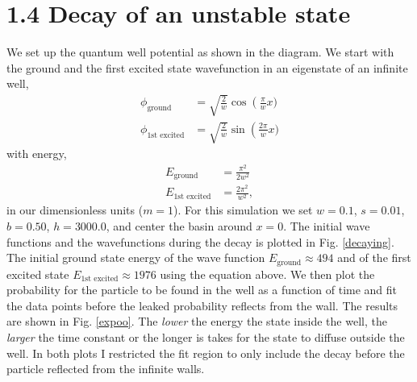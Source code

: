 \documentclass[singlepage,notitlepage,nofootinbib,11pt]{revtex4-1}
\begin{document}
\clearpage
\section*{1.4 Decay of an unstable state}
We set up the quantum well potential as shown in the diagram. We start with the ground and the first excited state wavefunction in an eigenstate of an infinite well,
\begin{align*}
  \phi_{\text{ground}} &= \sqrt{\frac{2}{w}}\cos\left(\frac{\pi}{w}x)\\
  \phi_{\text{1st excited}} &= \sqrt{\frac{2}{w}}\sin\left(\frac{2\pi}{w}x)
\end{align*}
with energy,
\begin{align*}
  E_{\text{ground}} &= \frac{\pi^2}{2 w^2}\\
  E_{\text{1st excited}} &= \frac{2 \pi^2}{w^2},
\end{align*}
in our dimensionless units ($m=1$). For this simulation we set $w=0.1$, $s=0.01$, $b=0.50$, $h=3000.0$, and center the basin around $x=0$. The initial wave functions and the wavefunctions during the decay is plotted in Fig. \ref{decaying}. The initial ground state energy of the wave function $E_{\text{ground}}\approx494$ and of the first excited state $E_{\text{1st excited}}\approx 1976$ using the equation above. We then plot the probability for the particle to be found in the well as a function of time and fit the data points before the leaked probability reflects from the wall. The results are shown in Fig. \ref{expoo}. The {\it lower} the energy the state inside the well, the {\it larger} the time constant or the longer is takes for the state to diffuse outside the well. In both plots I restricted the fit region to only include the decay before the particle reflected from the infinite walls.
\end{document}
